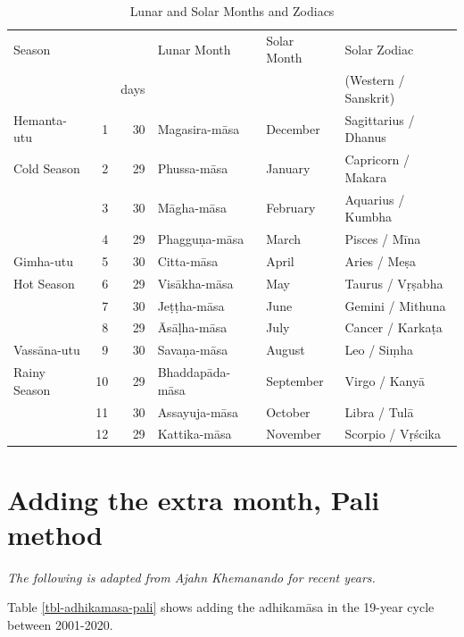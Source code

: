\documentclass[11pt,oneside]{memoir-article}
\begin{document}
\begin{table}[h]
\caption{\label{tbl-month-names} Lunar and Solar Months and Zodiacs\cite{hasapannyo-zodiac}}
\centering
\begin{tabular}{lrrlll}
Season &  &  & Lunar Month & Solar Month & Solar Zodiac\\
 &  & days &  &  & (Western / Sanskrit)\\
\hline
Hemanta-utu & 1 & 30 & Magasira-māsa & December & Sagittarius / Dhanus\\
Cold Season & 2 & 29 & Phussa-māsa & January & Capricorn / Makara\\
 & 3 & 30 & Māgha-māsa & February & Aquarius / Kumbha\\
 & 4 & 29 & Phagguṇa-māsa & March & Pisces / Mīna\\
\hline
Gimha-utu & 5 & 30 & Citta-māsa & April & Aries / Meṣa\\
Hot Season & 6 & 29 & Visākha-māsa & May & Taurus / Vṛṣabha\\
 & 7 & 30 & Jeṭṭha-māsa & June & Gemini / Mithuna\\
 & 8 & 29 & Āsāḷha-māsa & July & Cancer / Karkaṭa\\
\hline
Vassāna-utu & 9 & 30 & Savaṇa-māsa & August & Leo / Siṃha\\
Rainy Season & 10 & 29 & Bhaddapāda-māsa & September & Virgo / Kanyā\\
 & 11 & 30 & Assayuja-māsa & October & Libra / Tulā\\
 & 12 & 29 & Kattika-māsa & November & Scorpio / Vṛścika\\
\end{tabular}
\end{table}

\clearpage

\chapter{Adding the extra month, Pali method}
\label{sec-4}
\label{pali-method}


\emph{The following is adapted from Ajahn Khemanando for recent
years.}\cite{khemanando-adhikamasa}

Table \ref{tbl-adhikamasa-pali} shows adding the adhikamāsa in the 19-year
cycle between 2001-2020.
\end{document}
